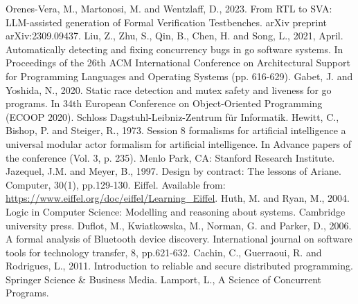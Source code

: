 \begin{thebibliography}{9}
Orenes-Vera, M., Martonosi, M. and Wentzlaff, D., 2023. From RTL to SVA: LLM-assisted generation of Formal Verification Testbenches. arXiv preprint arXiv:2309.09437.
Liu, Z., Zhu, S., Qin, B., Chen, H. and Song, L., 2021, April. Automatically detecting and fixing concurrency bugs in go software systems. In Proceedings of the 26th ACM International Conference on Architectural Support for Programming Languages and Operating Systems (pp. 616-629).
Gabet, J. and Yoshida, N., 2020. Static race detection and mutex safety and liveness for go programs. In 34th European Conference on Object-Oriented Programming (ECOOP 2020). Schloss Dagstuhl-Leibniz-Zentrum für Informatik.
Hewitt, C., Bishop, P. and Steiger, R., 1973. Session 8 formalisms for artificial intelligence a universal modular actor formalism for artificial intelligence. In Advance papers of the conference (Vol. 3, p. 235). Menlo Park, CA: Stanford Research Institute.
Jazequel, J.M. and Meyer, B., 1997. Design by contract: The lessons of Ariane. Computer, 30(1), pp.129-130.
Eiffel. Available from: \url{https://www.eiffel.org/doc/eiffel/Learning_Eiffel}.
Huth, M. and Ryan, M., 2004. Logic in Computer Science: Modelling and reasoning about systems. Cambridge university press.
Duflot, M., Kwiatkowska, M., Norman, G. and Parker, D., 2006. A formal analysis of Bluetooth device discovery. International journal on software tools for technology transfer, 8, pp.621-632.
Cachin, C., Guerraoui, R. and Rodrigues, L., 2011. Introduction to reliable and secure distributed programming. Springer Science \& Business Media.
Lamport, L., A Science of Concurrent Programs.
\end{thebibliography}